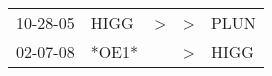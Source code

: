 \begin{supertabular}{lllll}
 10-28-05 &   HIGG &  \textgreater &  \textgreater &  PLUN \\
 02-07-08 &  *OE1* &               &  \textgreater &  HIGG \\
\end{supertabular}
